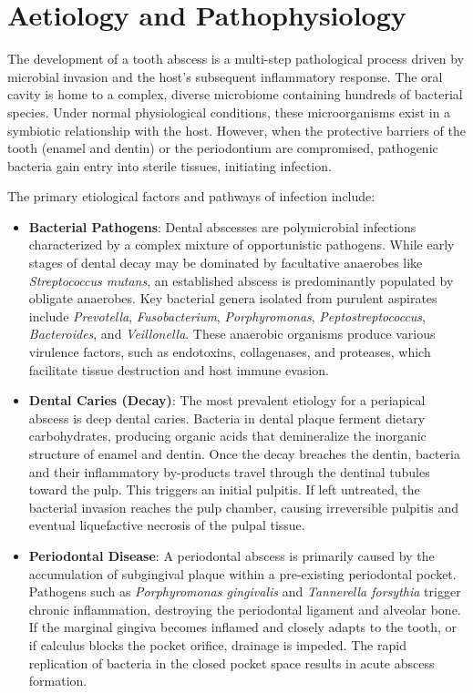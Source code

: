 \section*{Aetiology and Pathophysiology}
The development of a tooth abscess is a multi-step pathological process driven by microbial invasion and the host's subsequent inflammatory response. The oral cavity is home to a complex, diverse microbiome containing hundreds of bacterial species. Under normal physiological conditions, these microorganisms exist in a symbiotic relationship with the host. However, when the protective barriers of the tooth (enamel and dentin) or the periodontium are compromised, pathogenic bacteria gain entry into sterile tissues, initiating infection.

The primary etiological factors and pathways of infection include:
\begin{itemize}
  \item \textbf{Bacterial Pathogens}: Dental abscesses are polymicrobial infections characterized by a complex mixture of opportunistic pathogens. While early stages of dental decay may be dominated by facultative anaerobes like \textit{Streptococcus mutans}, an established abscess is predominantly populated by obligate anaerobes. Key bacterial genera isolated from purulent aspirates include \textit{Prevotella}, \textit{Fusobacterium}, \textit{Porphyromonas}, \textit{Peptostreptococcus}, \textit{Bacteroides}, and \textit{Veillonella}. These anaerobic organisms produce various virulence factors, such as endotoxins, collagenases, and proteases, which facilitate tissue destruction and host immune evasion.
  \item \textbf{Dental Caries (Decay)}: The most prevalent etiology for a periapical abscess is deep dental caries. Bacteria in dental plaque ferment dietary carbohydrates, producing organic acids that demineralize the inorganic structure of enamel and dentin. Once the decay breaches the dentin, bacteria and their inflammatory by-products travel through the dentinal tubules toward the pulp. This triggers an initial pulpitis. If left untreated, the bacterial invasion reaches the pulp chamber, causing irreversible pulpitis and eventual liquefactive necrosis of the pulpal tissue.
  \item \textbf{Periodontal Disease}: A periodontal abscess is primarily caused by the accumulation of subgingival plaque within a pre-existing periodontal pocket. Pathogens such as \textit{Porphyromonas gingivalis} and \textit{Tannerella forsythia} trigger chronic inflammation, destroying the periodontal ligament and alveolar bone. If the marginal gingiva becomes inflamed and closely adapts to the tooth, or if calculus blocks the pocket orifice, drainage is impeded. The rapid replication of bacteria in the closed pocket space results in acute abscess formation.

\end{itemize}
